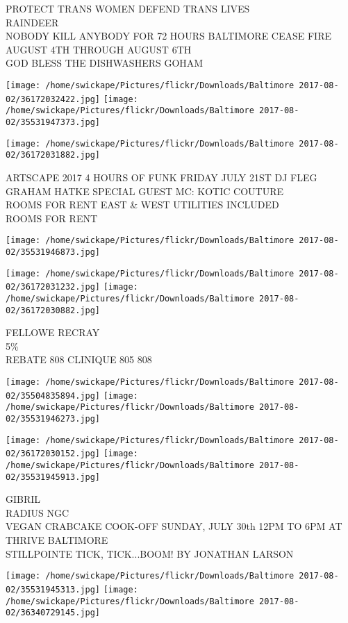 \documentclass[10pt,letterpaper]{article}
\begin{document}
PROTECT TRANS WOMEN DEFEND TRANS LIVES\\
RAINDEER\\
NOBODY KILL ANYBODY FOR 72 HOURS BALTIMORE CEASE FIRE AUGUST 4TH THROUGH AUGUST 6TH\\
GOD BLESS THE DISHWASHERS GOHAM
\pagebreak

\texttt{[image: /home/swickape/Pictures/flickr/Downloads/Baltimore 2017-08-02/36172032422.jpg]}
\texttt{[image: /home/swickape/Pictures/flickr/Downloads/Baltimore 2017-08-02/35531947373.jpg]}

\texttt{[image: /home/swickape/Pictures/flickr/Downloads/Baltimore 2017-08-02/36172031882.jpg]}

ARTSCAPE 2017 4 HOURS OF FUNK FRIDAY JULY 21ST DJ FLEG GRAHAM HATKE SPECIAL GUEST MC: KOTIC COUTURE\\
ROOMS FOR RENT EAST \& WEST UTILITIES INCLUDED\\
ROOMS FOR RENT
\pagebreak

\texttt{[image: /home/swickape/Pictures/flickr/Downloads/Baltimore 2017-08-02/35531946873.jpg]}

\vspace{0.25in}
\texttt{[image: /home/swickape/Pictures/flickr/Downloads/Baltimore 2017-08-02/36172031232.jpg]}
\texttt{[image: /home/swickape/Pictures/flickr/Downloads/Baltimore 2017-08-02/36172030882.jpg]}

FELLOWE RECRAY\\
5\%\\
REBATE 808 CLINIQUE 805 808
\pagebreak

\texttt{[image: /home/swickape/Pictures/flickr/Downloads/Baltimore 2017-08-02/35504835894.jpg]}
\texttt{[image: /home/swickape/Pictures/flickr/Downloads/Baltimore 2017-08-02/35531946273.jpg]}

\texttt{[image: /home/swickape/Pictures/flickr/Downloads/Baltimore 2017-08-02/36172030152.jpg]}
\texttt{[image: /home/swickape/Pictures/flickr/Downloads/Baltimore 2017-08-02/35531945913.jpg]}

GIBRIL\\
RADIUS NGC\\
VEGAN CRABCAKE COOK{-}OFF SUNDAY, JULY 30th 12PM TO 6PM AT THRIVE BALTIMORE\\
STILLPOINTE TICK, TICK...BOOM!  BY JONATHAN LARSON
\pagebreak

\texttt{[image: /home/swickape/Pictures/flickr/Downloads/Baltimore 2017-08-02/35531945313.jpg]}
\texttt{[image: /home/swickape/Pictures/flickr/Downloads/Baltimore 2017-08-02/36340729145.jpg]}
\end{document}
